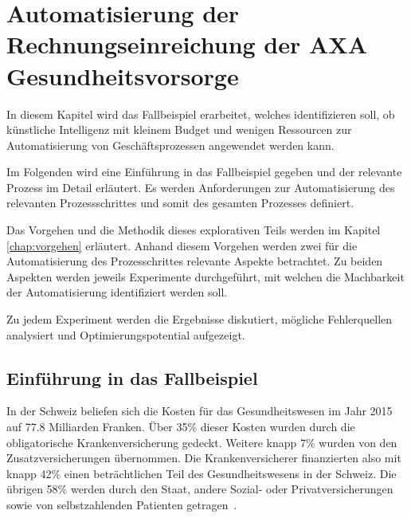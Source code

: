 \section{Automatisierung der Rechnungseinreichung der AXA \nohyphens{Gesundheitsvorsorge}}
\label{chap:experiment}

In diesem Kapitel wird das Fallbeispiel erarbeitet, welches identifizieren soll, ob künstliche Intelligenz mit kleinem Budget und wenigen Ressourcen zur Automatisierung von Geschäftsprozessen angewendet werden kann. 

Im Folgenden wird eine Einführung in das Fallbeispiel gegeben und der relevante Prozess im Detail erläutert. Es werden Anforderungen zur Automatisierung des relevanten Prozessschrittes und somit des gesamten Prozesses definiert.

Das Vorgehen und die Methodik dieses explorativen Teils werden im Kapitel \ref{chap:vorgehen} erläutert. Anhand diesem Vorgehen werden zwei für die Automatisierung des Prozesschrittes relevante Aspekte betrachtet. Zu beiden Aspekten werden jeweils Experimente durchgeführt, mit welchen die Machbarkeit der Automatisierung identifiziert werden soll.

Zu jedem Experiment werden die Ergebnisse diskutiert, mögliche Fehlerquellen analysiert und Optimierungspotential aufgezeigt.




\subsection{Einführung in das Fallbeispiel}
In der Schweiz beliefen sich die Kosten für das Gesundheitswesen im Jahr 2015 auf 77.8 Milliarden Franken. Über 35\% dieser Kosten wurden durch die obligatorische Krankenversicherung gedeckt. Weitere knapp 7\% wurden von den Zusatzversicherungen übernommen. Die Krankenversicherer finanzierten also mit knapp 42\% einen beträchtlichen Teil des Gesundheitswesens in der Schweiz. Die übrigen 58\% werden durch den Staat, andere Sozial- oder Privatversicherungen sowie von selbstzahlenden Patienten getragen~\autocite{BfS2018}.


